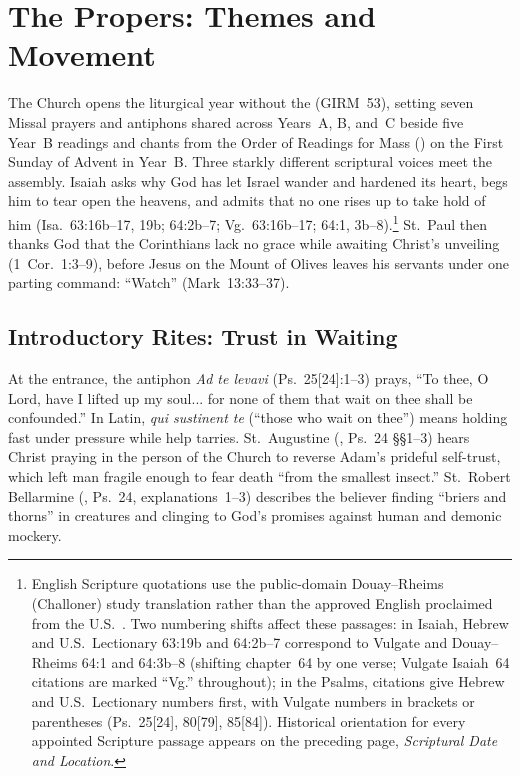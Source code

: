 \section{The Propers: Themes and Movement}
%

The Church opens the liturgical year without the  (GIRM~53), setting seven Missal prayers and antiphons shared across Years~A, B, and~C beside five Year~B readings and chants from the Order of Readings for Mass () on the First Sunday of Advent in Year~B. Three starkly different scriptural voices meet the assembly. Isaiah asks why God has let Israel wander and hardened its heart, begs him to tear open the heavens, and admits that no one rises up to take hold of him (Isa.~63:16b--17, 19b; 64:2b--7; Vg.~63:16b--17; 64:1, 3b--8).\footnote{English Scripture quotations use the public-domain Douay--Rheims (Challoner) study translation rather than the approved English proclaimed from the U.S.\ . Two numbering shifts affect these passages: in Isaiah, Hebrew and U.S.\ Lectionary 63:19b and 64:2b--7 correspond to Vulgate and Douay--Rheims 64:1 and 64:3b--8 (shifting chapter~64 by one verse; Vulgate Isaiah~64 citations are marked ``Vg.'' throughout); in the Psalms, citations give Hebrew and U.S.\ Lectionary numbers first, with Vulgate numbers in brackets or parentheses (Ps.~25[24], 80[79], 85[84]). Historical orientation for every appointed Scripture passage appears on the preceding page, \emph{Scriptural Date and Location}.} St.~Paul then thanks God that the Corinthians lack no grace while awaiting Christ's unveiling (1~Cor.~1:3--9), before Jesus on the Mount of Olives leaves his servants under one parting command: ``Watch'' (Mark~13:33--37).

\subsection{Introductory Rites: Trust in Waiting}

At the entrance, the antiphon \emph{Ad te levavi} (Ps.~25[24]:1--3) prays, ``To thee, O Lord, have I lifted up my soul... for none of them that wait on thee shall be confounded.'' In Latin, \emph{qui sustinent te} (``those who wait on thee'') means holding fast under pressure while help tarries. St.~Augustine (, Ps.~24 §§1--3) hears Christ praying in the person of the Church to reverse Adam's prideful self-trust, which left man fragile enough to fear death ``from the smallest insect.'' St.~Robert Bellarmine (, Ps.~24, explanations~1--3) describes the believer finding ``briers and thorns'' in creatures and clinging to God's promises against human and demonic mockery.

